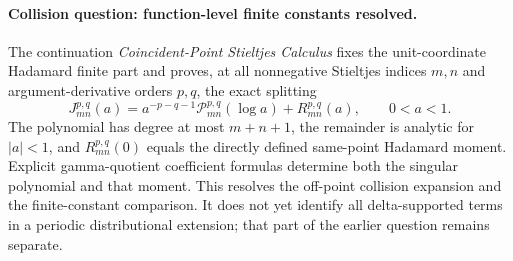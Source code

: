\paragraph{Collision question: function-level finite constants resolved.}
The continuation \emph{Coincident-Point Stieltjes Calculus} fixes the
unit-coordinate Hadamard finite part and proves, at all nonnegative
Stieltjes indices $m,n$ and argument-derivative orders $p,q$, the exact
splitting
\[
 J_{mn}^{p,q}(a)
 =a^{-p-q-1}\mathcal P_{mn}^{p,q}(\log a)+R_{mn}^{p,q}(a),
 \qquad 0<a<1.
\]
The polynomial has degree at most $m+n+1$, the remainder is analytic for
$|a|<1$, and $R_{mn}^{p,q}(0)$ equals the directly defined same-point
Hadamard moment. Explicit gamma-quotient coefficient formulas determine
both the singular polynomial and that moment. This resolves the off-point
collision expansion and the finite-constant comparison. It does not yet
identify all delta-supported terms in a periodic distributional extension;
that part of the earlier question remains separate.
